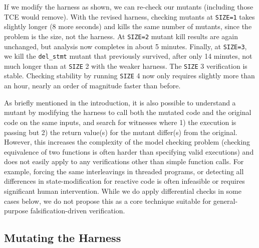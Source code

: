 \documentclass{svjour3}
\begin{document}
If we modify the harness as shown, we can re-check our mutants
(including those TCE would remove).  With the revised harness,
checking mutants at {\tt SIZE=1} takes slightly longer (8 more
seconds) and kills the same number of mutants, since the problem is
the size, not the harness.  At {\tt SIZE=2} mutant kill results are
again unchanged, but analysis now completes in about 5 minutes.  Finally, at
{\tt SIZE=3}, we kill the {\tt del\_stmt} mutant that previously
survived, after only 14 minutes, not much longer than at {\tt SIZE} 2
with the weaker harness.  The {\tt SIZE} 3 verification is stable.
Checking stability by running {\tt SIZE} 4 now only requires slightly
more than an hour, nearly an order of magnitude faster than before.  

As briefly mentioned in the introduction, it is also possible to
understand a mutant by modifying the harness to call both the mutated
code and the original code on the same inputs, and search for
witnesses where 1) the execution is passing but 2) the return value(s)
for the mutant differ(s) from the original.  However, this
increases the complexity of the model checking problem (checking
equivalence of two functions is often harder than
specifying valid executions) and does not easily apply to any
verifications other than simple function calls.  For example, forcing
the same interleavings in threaded programs, or detecting all
differences in state-modification for reactive code is often
infeasible or requires significant human intervention.  While we do
apply differential checks in some cases below, we do not propose this
as a core technique suitable for general-purpose falsification-driven
verification.

\subsection{Mutating the Harness}
\label{sec:checkharness}
\end{document}
